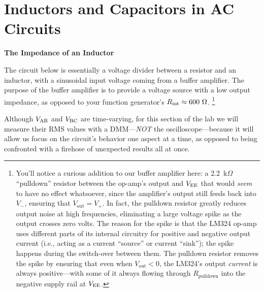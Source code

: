 \section{Inductors and Capacitors in AC Circuits }
\label{lab_ac_circuits}


\bigskip

\textbf{The Impedance of an Inductor}


The circuit below is essentially a voltage divider between a resistor and an inductor, with a sinusoidal input voltage coming from a buffer amplifier.  
The purpose of the buffer amplifier is to provide a voltage source with a low output impedance, as opposed to your function generator's $R_{\rm int} \approx 600~\Omega$.%
\footnote{You'll notice a curious addition to our buffer amplifier here: a 2.2~k$\Omega$ ``pulldown'' resistor between the op-amp's output and $V_{\rm EE}$ that would \textit{seem} to have no effect whatsoever, since the amplifier's output still feeds back into $V_-$, ensuring that $V_\text{out}=V_+$.  In fact, the pulldown resistor greatly reduces output noise at high frequencies, eliminating a large voltage spike as the output crosses zero volts.  The reason for the spike is that the LM324 op-amp uses different parts of its internal circuitry for positive and negative output current (i.e., acting as a current ``source'' or current ``sink''); the spike happens during the switch-over between them. The pulldown resistor removes the spike by ensuring that even when  $V_\text{out}<0$, the LM324's output \textit{current} is always positive---with some of it always flowing through $R_\text{pulldown}$ into the negative supply rail at $V_{\rm EE}$.}

Although $V_{\rm AB}$ and $V_{\rm BC}$ are time-varying, for this section of the lab we will measure their RMS values with a DMM---\textit{NOT} the oscilloscope---because it will allow us focus on the circuit's behavior one aspect at a time, as opposed to being confronted with a firehose of unexpected results all at once.

